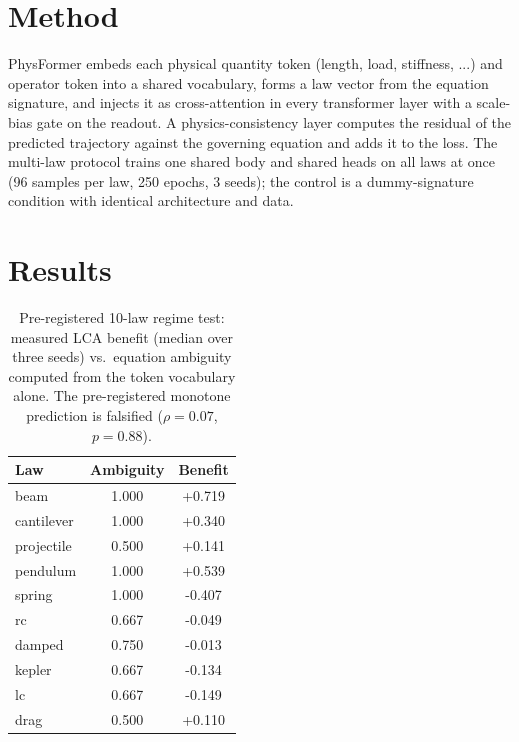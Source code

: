 \documentclass[conference,10pt]{IEEEtran}
\begin{document}
\section{Method}
PhysFormer embeds each physical quantity token (length, load, stiffness, ...) and operator token into a shared vocabulary, forms a law vector from the equation signature, and injects it as cross-attention in every transformer layer with a scale-bias gate on the readout. A physics-consistency layer computes the residual of the predicted trajectory against the governing equation and adds it to the loss. The multi-law protocol trains one shared body and shared heads on all laws at once (96 samples per law, 250 epochs, 3 seeds); the control is a dummy-signature condition with identical architecture and data.

\section{Results}
\begin{table}[!t]
\caption{Pre-registered 10-law regime test: measured LCA benefit (median over
three seeds) vs.\ equation ambiguity computed from the token vocabulary
alone. The pre-registered monotone prediction is falsified
($\rho = 0.07$, $p = 0.88$).}
\label{tab:regime}
\centering
\begin{tabular}{lcc}
\toprule
Law & Ambiguity & Benefit \\
\midrule
beam & 1.000 & +0.719 \\
cantilever & 1.000 & +0.340 \\
projectile & 0.500 & +0.141 \\
pendulum & 1.000 & +0.539 \\
spring & 1.000 & -0.407 \\
rc & 0.667 & -0.049 \\
damped & 0.750 & -0.013 \\
kepler & 0.667 & -0.134 \\
lc & 0.667 & -0.149 \\
drag & 0.500 & +0.110 \\
\bottomrule
\end{tabular}
\end{table}
\end{document}

